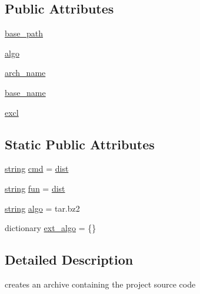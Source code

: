 \subsection*{Public Attributes}
\begin{DoxyCompactItemize}
\item 
\hyperlink{classwaflib_1_1_scripting_1_1_dist_a45d32861a60323e6f57f46da1f10f627}{base\+\_\+path}
\item 
\hyperlink{classwaflib_1_1_scripting_1_1_dist_a83c6042f94bda0555405c8bebab637ea}{algo}
\item 
\hyperlink{classwaflib_1_1_scripting_1_1_dist_a5ba9c50be1e311604df0353b280ce397}{arch\+\_\+name}
\item 
\hyperlink{classwaflib_1_1_scripting_1_1_dist_a295d84420512419395361efa5e6b9b50}{base\+\_\+name}
\item 
\hyperlink{classwaflib_1_1_scripting_1_1_dist_a5b9ee4e1f49dbd813f415c8f7aa293cc}{excl}
\end{DoxyCompactItemize}
\subsection*{Static Public Attributes}
\begin{DoxyCompactItemize}
\item 
\hyperlink{test__lib_f_l_a_c_2format_8c_ab02026ad0de9fb6c1b4233deb0a00c75}{string} \hyperlink{classwaflib_1_1_scripting_1_1_dist_a00aafd0547b126ad1719ec462682a260}{cmd} = \textquotesingle{}\hyperlink{namespacewaflib_1_1_scripting_ade42ef48015fcded2eb15f341967ff47}{dist}\textquotesingle{}
\item 
\hyperlink{test__lib_f_l_a_c_2format_8c_ab02026ad0de9fb6c1b4233deb0a00c75}{string} \hyperlink{classwaflib_1_1_scripting_1_1_dist_ae6e4243f83b8e73a9f995929fb80179e}{fun} = \textquotesingle{}\hyperlink{namespacewaflib_1_1_scripting_ade42ef48015fcded2eb15f341967ff47}{dist}\textquotesingle{}
\item 
\hyperlink{test__lib_f_l_a_c_2format_8c_ab02026ad0de9fb6c1b4233deb0a00c75}{string} \hyperlink{classwaflib_1_1_scripting_1_1_dist_a1d7119b0d0bba44b5d696ed735ef12c4}{algo} = \textquotesingle{}tar.\+bz2\textquotesingle{}
\item 
dictionary \hyperlink{classwaflib_1_1_scripting_1_1_dist_a5347d2e30c6bedc159e8eb97b756add8}{ext\+\_\+algo} = \{\}
\end{DoxyCompactItemize}


\subsection{Detailed Description}
\begin{DoxyVerb}creates an archive containing the project source code\end{DoxyVerb}
 

